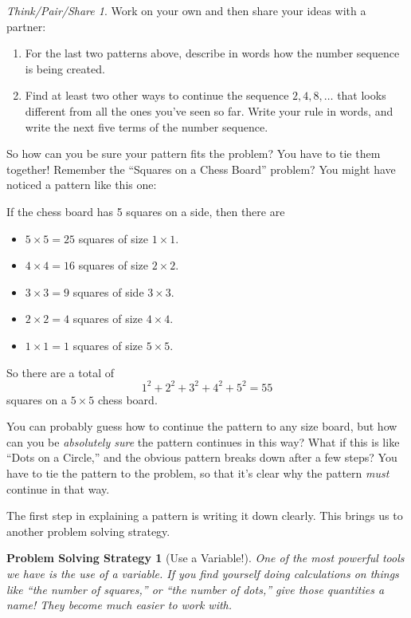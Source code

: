 \documentclass[10pt, reqno]{amsart}
\newtheorem{ps}{Problem Solving Strategy}
\theoremstyle{remark}
\newtheorem*{thinkpair*}{Think/Pair/Share}
\theoremstyle{definition}
\numberwithin{equation}{section}  %
\begin{document}
\begin{thinkpair*}
Work on your own and then share your ideas with a partner:
\begin{enumerate}
\item
For the last two patterns above, describe in words how the number sequence is being created.  
\item
Find at least two other ways to continue the sequence $2, 4, 8, \dots$ that looks different from all the ones you've seen so far.  Write your rule in words, and write the next five terms of the number sequence.
\end{enumerate}
\end{thinkpair*}

So how can you be sure your pattern fits the problem?  You have to tie them together!  Remember the ``Squares on a Chess Board'' problem?  You might have noticed a pattern like this one:

If the chess board has 5 squares on a side, then there are
\begin{itemize}
\item
$5 \times 5 =25$ squares of size $1 \times 1$.
\item
$4 \times 4 = 16$ squares of size $2 \times 2$.
\item
$3 \times 3 =9$ squares of side $3 \times 3$.
\item 
$2 \times 2 = 4$ squares of size $4 \times 4$.
\item
$1 \times 1 = 1$ squares of size $5 \times 5$.
\end{itemize}
So there are a total of
\[
1^2 + 2^2 + 3^2 + 4^2 + 5^2 = 55
\]
squares on a $5 \times 5$ chess board.

You can probably guess how to continue the pattern to any size board, but  how can you be \emph{absolutely sure} the pattern continues in this way?  What if this is like ``Dots on a Circle,'' and the obvious pattern breaks down after a few steps? You have to tie the pattern to the problem, so that it's clear why the pattern \emph{must} continue in that way.

The first step in explaining a pattern is writing it down clearly.  This brings us to another problem solving strategy.

\begin{ps}[Use a Variable!]
One of the most powerful tools we have   is the use of a \emph{variable}.  If you find yourself doing calculations on things like ``the number of squares,'' or ``the number of dots,'' give those quantities a name!  They become much easier to work with.
\end{ps}
\end{document}
